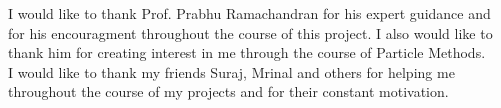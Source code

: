 \acknowledgments

I would like to thank Prof. Prabhu Ramachandran for his expert guidance and for his encouragment throughout the course of this project. I also would like to thank him for creating interest in me through the course of Particle Methods.\\

\noindent
I would like to thank my friends Suraj, Mrinal and others for helping me throughout the course of my projects and for their constant motivation.\\





\signature{\today}


